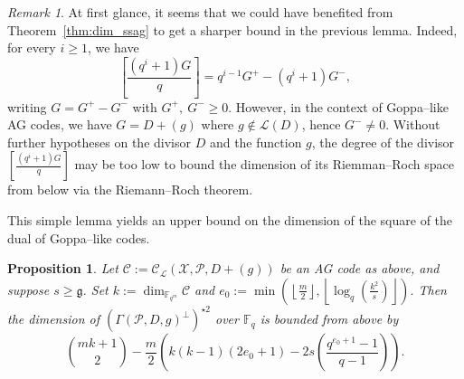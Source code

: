 \documentclass[lettersize,journal]{IEEEtran}
\theoremstyle{plain}
\newtheorem{proposition}[thm]{Proposition}
\theoremstyle{definition}
\theoremstyle{remark}
\newtheorem{remark}[thm]{Remark}
\newcommand{\calP}{\mathcal{P}}
\newcommand{\calL}{\mathcal{L}}
\newcommand{\calC}{\mathcal{C}}
\newcommand{\calX}{\mathcal{X}}
\newcommand{\fqm}{\mathbb{F}_{q^m}}
\newcommand{\fq}{\mathbb{F}_{q}}
\begin{document}
	\begin{remark}\label{rmk:improvements}
		At first glance, it seems that we could have benefited from Theorem~\ref{thm:dim_ssag} to get a sharper bound in the previous lemma. Indeed, for every $i \geq 1$, we have 
		\[\left[\frac{(q^i+1)G}{q}\right]=q^{i-1}G^+ - (q^i+1)G^-,\]
		writing $G=G^+-G^-$ with $G^+, \: G^- \geq 0$. However, in the context of Goppa--like AG codes, we have $G=D+(g)$ where $g \notin \calL(D)$, hence $G^- \neq 0$. Without further hypotheses on the divisor $D$ and the function $g$, the degree of the divisor $\left[\frac{(q^i+1)G}{q}\right]$ may be too low to bound the dimension of its Riemman--Roch space from below via the Riemann--Roch theorem.
	\end{remark}
	
	This simple lemma yields an upper bound on the dimension of the square of the dual of Goppa--like codes.
	\begin{proposition} \label{prop:bound_dim_using_inclusions}
		Let $\calC := \calC_{\calL}(\calX,\calP,D+(g))$ be an AG code as above, and suppose $s \geq \mathfrak{g}$. Set $k := \dim_{\fqm}\calC$ and  $e_0 := \min\left(\left\lfloor \frac{m}{2} \right\rfloor,\left\lfloor \log_q\left(\frac{k^2}{s}\right)\right\rfloor\right)$. Then the dimension of $(\Gamma(\calP,D,g)^{\perp})^{\star 2}$ over $\fq$ is bounded from above by
\[
 \binom{mk+1}{2} - \dfrac{m}{2}\left(k(k-1)(2e_0+1)-2s\left(\dfrac{q^{e_0+1}-1}{q-1}\right)\right).
\]		
	\end{proposition}
	
\end{document}
